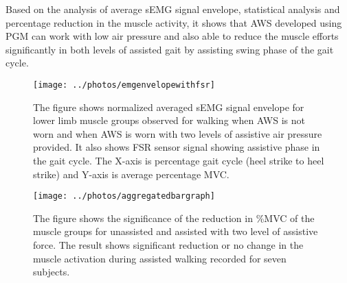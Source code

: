 \documentclass[letterpaper, 10 pt, conference]{ieeeconf}  %
\begin{document}
Based on the analysis of average sEMG signal envelope, statistical analysis and percentage reduction in the muscle activity, it shows that AWS developed using PGM can work with low air pressure and also able to reduce the muscle efforts significantly in both levels of assisted gait by assisting swing phase of the gait cycle. 

\begin{figure*}
	\centering
	\texttt{[image: ../photos/emgenvelopewithfsr]}
	\caption{The figure shows normalized averaged sEMG signal envelope for lower limb muscle groups observed for walking when AWS is not worn and when AWS is worn with two levels of assistive air pressure provided. It also shows FSR sensor signal showing assistive phase in the gait cycle. The X-axis is percentage gait cycle (heel strike to heel strike) and Y-axis is average percentage MVC.}
	\label{fig:emgenvelope}
\end{figure*}

\begin{figure*}
	\centering
	\texttt{[image: ../photos/aggregatedbargraph]}
	\caption{The figure shows the significance of the reduction in \%MVC of the muscle groups for unassisted and assisted with two level of assistive force. The result shows significant reduction or no change in the muscle activation during assisted walking recorded for seven subjects.}
	\label{fig:aggregatedbargraph}
\end{figure*}
\end{document}
